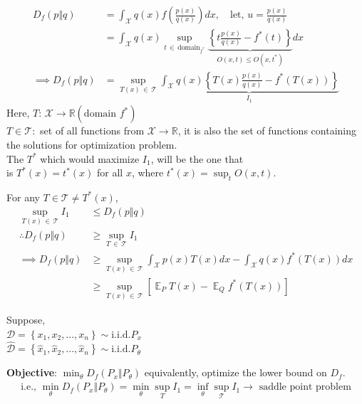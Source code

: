 \documentclass[11pt]{article}
\DeclareMathOperator*{\E}{\mathbb{E}}
\begin{document}
\begin{align*}
  D_f(p \Vert q) &= \int_{\mathcal{X}} q(x) f \left( \frac{p(x)}{q(x)} \right)dx,
                   \quad\text{let, }u = \frac{p(x)}{q(x)} \\
                 &= \int_{\mathcal{X}} q(x) \sup_{t\, \in\, \text{domain}_{f^{*}}}
                   \underbrace{\left\{ t \frac{p(x)}{q(x)} - f^{*}(t) \right\}}_{O(x, t) \leq O(x, t^{*})}dx \\
  \implies D_f(p \Vert q) &= \sup_{T(x)\, \in\, \mathcal{T}} \underbrace{\int_{\mathcal{X}} q(x)
                            \left\{ T(x) \frac{p(x)}{q(x)} - f^{*}(T(x)) \right\}}_{I_1}
\end{align*}
Here,  $T: \,\mathcal{X} \rightarrow \mathbb{R}(\text{domain } f^{*})$ \\
$T \in \mathcal{T}: $ set of all functions from $ \mathcal{X} \rightarrow \mathbb{R}$,
it is also the set of functions containing the solutions for optimization problem. \\

The $T^{*}$ which would maximize $I_1$, will be the one that \\
is $T^{*}(x) = t^{*}(x)$ for all $x$, where $t^{*}(x) = \sup_tO(x, t)$.

\vspace{1em}
For any $T \in \mathcal{T} \not = T^{*}(x)$,
\begin{align*}
  \sup_{T(x)\, \in\, \mathcal{T}} I_1 &\leq D_f(p \Vert q) \\
  \therefore D_f(p \Vert q) &\geq \sup_{T\, \in\, \mathcal{T}} I_1 \\
  \implies D_f(p \Vert q) &\geq \sup_{T(x)\, \in\, \mathcal{T}} \int_{\mathcal{X}} p(x)T(x)dx
                            - \int_{\mathcal{X}} q(x) f^{*}(T(x))dx \\
  &\geq \sup_{T(x)\, \in\, \mathcal{T}} \left[ \E_P T(x) - \E_Q f^{*}(T(x)) \right]
\end{align*}

\begin{framed}
  Suppose, \\
  $\mathcal{D} = \left\{ x_1, x_2, ..., x_n \right\} \sim \text{i.i.d.} P_x$ \\
  $\mathcal{\hat{D}} = \left\{ \hat{x}_1, \hat{x}_2, ..., \hat{x}_n \right\} \sim \text{i.i.d.} P_{\theta}$

  \vspace{1em}
  \textbf{Objective}: $\min_{\theta} D_f(P_x \Vert P_{\theta})$ equivalently, optimize the lower bound on $D_f$.
  \begin{align*}
    \text{i.e., }\min_{\theta} D_f(P_x \Vert P_{\theta}) = \min_{\theta} \sup_T I_1 = \inf_{\theta} \sup_{\mathcal{T}} I_1 \rightarrow \text{ saddle point problem}
  \end{align*}
\end{framed}
\end{document}
